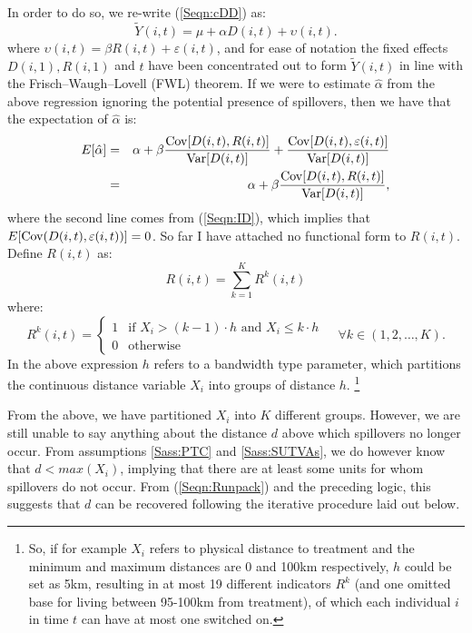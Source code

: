 In order to do so, we re-write (\ref{Seqn:cDD}) as:
\begin{equation}
\label{Seqn:cDDconc}
\tilde{Y}(i,t)=\mu + \alpha D(i,t) + \upsilon(i,t).
\end{equation}
where $\upsilon(i,t)=\beta R(i,t)+\varepsilon(i,t)$, and for ease of notation
the fixed effects $D(i,1), R(i,1)$ and $t$ have been concentrated out to form
$\tilde{Y}(i,t)$ in line with the  Frisch--Waugh--Lovell (FWL) theorem.  If we 
were to estimate $\hat\alpha$ from the above regression ignoring the potential 
presence of spillovers, then we have that the expectation of $\hat\alpha$ is:
\begin{eqnarray}
\label{Seqn:alphaExp}
E[\hat\alpha] &=& \alpha + \beta\frac{\mathrm{Cov}[D(i,t),R(i,t)]}{\mathrm{Var}[D(i,t)]}+\frac{\mathrm{Cov}[D(i,t),\varepsilon(i,t)]}{\mathrm{Var}[D(i,t)]} \nonumber \\ 
              &=& \alpha + \beta\frac{\mathrm{Cov}[D(i,t),R(i,t)]}{\mathrm{Var}[D(i,t)]},
\end{eqnarray}
where the second line comes from (\ref{Seqn:ID}), which implies that 
$E[\mathrm{Cov}(D(i,t),\varepsilon(i,t))]=0$.  So far I have attached no functional form 
to $R(i,t)$.  Define $R(i,t)$ as:
\begin{equation}
\label{Seqn:Runpack}
R(i,t) = \sum_{k=1}^K R^k(i,t)
\end{equation}  
where:
\begin{equation}
\label{Seqn:Rpar}
 R^k(i,t) =
  \begin{cases}
   1   & \text{if\ \ } X_i>(k-1)\cdot h \text{\ \ and \ } X_i\leq k\cdot h \\
   0   & \text{otherwise} 
  \end{cases}\ \ \ \ \ \forall k \in (1,2,\ldots,K).
\end{equation}
In the above expression $h$ refers to a bandwidth type parameter, which 
partitions the continuous distance variable $X_i$ into groups of distance $h$.%
\footnote{So, if for example $X_i$ refers to physical distance to treatment and 
the minimum and maximum distances are 0 and 100km respectively, $h$ could be set 
as 5km, resulting in at most 19 different indicators $R^k$ (and one omitted
base for living between 95-100km from treatment), of which each individual $i$ 
in time $t$ can have at most one switched on.}

From the above, we have partitioned $X_i$ into $K$ different groups. However, we
are still unable to say anything about the distance $d$ above which spillovers no 
longer occur. From assumptions \ref{Sass:PTC} and \ref{Sass:SUTVAs}, we do 
however know that $d<max(X_i)$, implying that there are at least some units for 
whom spillovers do not occur.  From (\ref{Seqn:Runpack}) and the preceding logic, 
this suggests that $d$ can be recovered following the iterative procedure laid 
out below.

